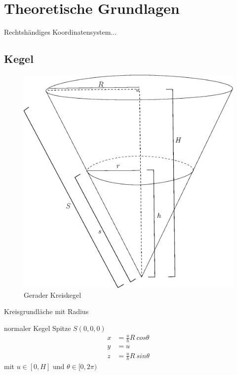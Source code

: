 \chapter{Theoretische Grundlagen}
\label{ch:theory}

Rechtshändiges Koordinatensystem...
\section{Kegel}
\label{s:cone}

\begin{figure}[!htb]
	\centering
	\includegraphics[scale=.5]{images/fullCone3.eps}
	\caption{Gerader Kreiskegel}
	\label{fig:cone}
\end{figure}

Kreisgrundläche mit Radius 


normaler Kegel Spitze $S(0,0,0)$
\begin{equation}
\begin{aligned}
x &= \frac{u}{h} R~cos \theta \\
y &= u \\
z &= \frac{u}{h} R~sin \theta
\end{aligned}
\end{equation}
mit $u\in [0, H]$ und $\theta \in [0, 2\pi)$


